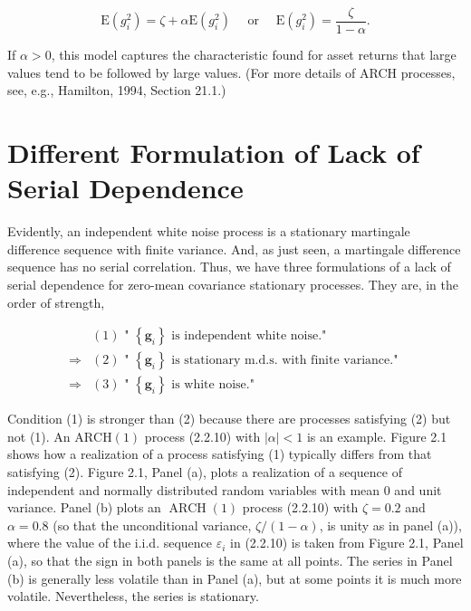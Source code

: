 \documentclass[10pt]{article}
\begin{document}
\begin{equation*}
\mathrm{E}\left(g_{i}^{2}\right)=\zeta+\alpha \mathrm{E}\left(g_{i}^{2}\right) \quad \text { or } \quad \mathrm{E}\left(g_{i}^{2}\right)=\frac{\zeta}{1-\alpha} . \tag{2.2.14}
\end{equation*}


If $\alpha>0$, this model captures the characteristic found for asset returns that large values tend to be followed by large values. (For more details of ARCH processes, see, e.g., Hamilton, 1994, Section 21.1.)

\section*{Different Formulation of Lack of Serial Dependence}
Evidently, an independent white noise process is a stationary martingale difference sequence with finite variance. And, as just seen, a martingale difference sequence has no serial correlation. Thus, we have three formulations of a lack of serial dependence for zero-mean covariance stationary processes. They are, in the order of strength,


\begin{align*}
& (1) \text { " }\left\{\mathbf{g}_{i}\right\} \text { is independent white noise." } \\
\Rightarrow & (2) \text { " }\left\{\mathbf{g}_{i}\right\} \text { is stationary m.d.s. with finite variance." } \\
\Rightarrow & (3) \text { " }\left\{\mathbf{g}_{i}\right\} \text { is white noise." } \tag{2.2.15}
\end{align*}


Condition (1) is stronger than (2) because there are processes satisfying (2) but not (1). An $\mathrm{ARCH}(1)$ process (2.2.10) with $|\alpha|<1$ is an example. Figure 2.1 shows how a realization of a process satisfying (1) typically differs from that satisfying (2). Figure 2.1, Panel (a), plots a realization of a sequence of independent and normally distributed random variables with mean 0 and unit variance. Panel (b) plots an $\operatorname{ARCH}(1)$ process (2.2.10) with $\zeta=0.2$ and $\alpha=0.8$ (so that the unconditional variance, $\zeta /(1-\alpha)$, is unity as in panel (a)), where the value of the i.i.d. sequence $\varepsilon_{i}$ in (2.2.10) is taken from Figure 2.1, Panel (a), so that the sign in both panels is the same at all points. The series in Panel (b) is generally less volatile than in Panel (a), but at some points it is much more volatile. Nevertheless, the series is stationary.
\end{document}

